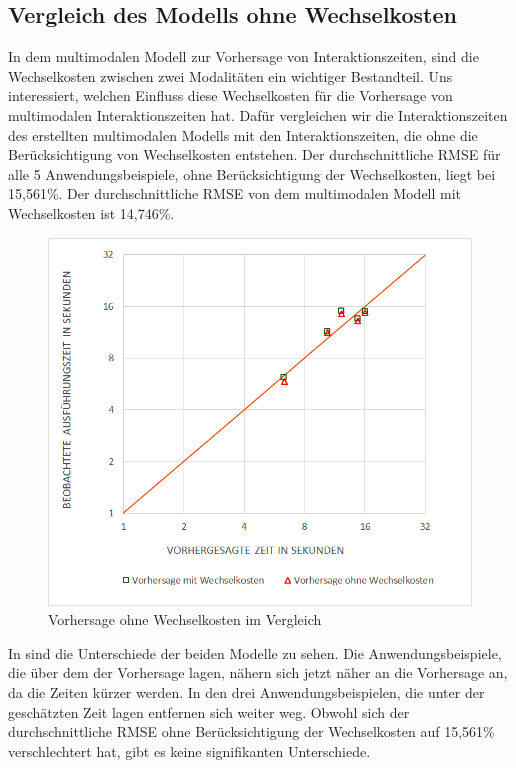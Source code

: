 \subsection{Vergleich des Modells ohne Wechselkosten}
In dem multimodalen Modell zur Vorhersage von Interaktionszeiten, sind die Wechselkosten zwischen zwei Modalitäten ein wichtiger Bestandteil. 
Uns interessiert, welchen Einfluss diese Wechselkosten für die Vorhersage von multimodalen Interaktionszeiten hat. 
Dafür vergleichen wir die Interaktionszeiten des erstellten multimodalen Modells mit den Interaktionszeiten, die ohne die Berücksichtigung von Wechselkosten entstehen.
Der durchschnittliche RMSE für alle 5 Anwendungsbeispiele, ohne Berücksichtigung der Wechselkosten, liegt bei 15,561\%. Der durchschnittliche RMSE von dem multimodalen Modell mit Wechselkosten ist 14,746\%. 
\begin{figure}[ht]
	\centering
		\includegraphics[width=1\textwidth]{img/Vorhersagezeit_ohne_Wechselkosten.jpg}
	\caption[Interaktionszeiten ohne Wechselkosten]{Vorhersage ohne Wechselkosten im Vergleich}
	\label{fig:Vorhersagezeit_ohne_Wechselkosten}
\end{figure}
In  sind die Unterschiede der beiden Modelle zu sehen. 
Die Anwendungsbeispiele, die über dem der Vorhersage lagen, nähern sich jetzt näher an die Vorhersage an, da die Zeiten kürzer werden. In den drei Anwendungsbeispielen, die unter der geschätzten Zeit lagen entfernen sich weiter weg. 
Obwohl sich der durchschnittliche RMSE ohne Berücksichtigung der Wechselkosten auf 15,561\% verschlechtert hat, gibt es keine signifikanten Unterschiede.
 
